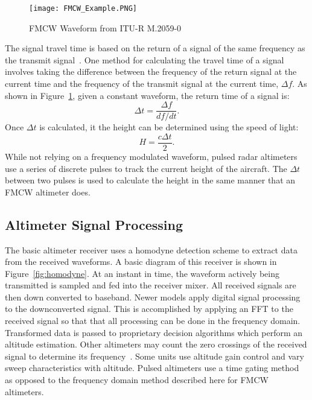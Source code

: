 \begin{figure}
 \centering
 \texttt{[image: FMCW\_Example.PNG]}
 \caption{FMCW Waveform from ITU-R M.2059-0 ~\cite{noauthor_operational_2014}}
 \label{fig:FMCW}
\end{figure}
The signal travel time is based on the return of a signal of the same frequency as the transmit signal~\cite{noauthor_operational_2014}. One method for calculating the travel time of a signal involves taking the difference between the frequency of the return signal at the current time and the frequency of the transmit signal at the current time, $\Delta f$. As shown in Figure~\ref{fig:FMCW}, given a constant waveform, the return time of a signal is:
\begin{equation*}
\Delta t = \frac{\Delta f}{df/dt} .
\end{equation*}
Once $\Delta t$ is calculated, it the height can be determined using the speed of light: 
\begin{equation*}
H = \frac{c\Delta t}{2} .
\end{equation*}
While not relying on a frequency modulated waveform, pulsed radar altimeters use a series of discrete pulses to track the current height of the aircraft. The $\Delta t$ between two pulses is used to calculate the height in the same manner that an FMCW altimeter does. 

\subsection{Altimeter Signal Processing}
The basic altimeter receiver uses a homodyne detection scheme to extract data from the received waveforms. A basic diagram of this receiver is shown in Figure~\ref{fig:homodyne}. At an instant in time, the waveform actively being transmitted is sampled and fed into the receiver mixer. All received signals are then down converted to baseband. Newer models apply digital signal processing to the downconverted signal. This is accomplished by applying an FFT to the received signal so that that all processing can be done in the frequency domain. Transformed data is passed to proprietary decision algorithms which perform an altitude estimation. Other altimeters may count the zero crossings of the received signal to determine its frequency~\cite{noauthor_operational_2014}. Some units use altitude gain control and vary sweep characteristics with altitude. Pulsed altimeters use a time gating method as opposed to the frequency domain method described here for FMCW altimeters. 

